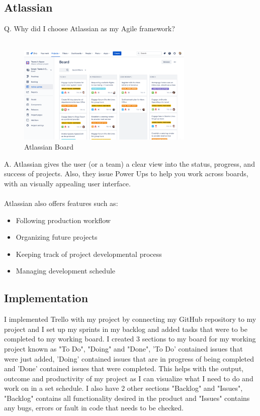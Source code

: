 \subsection{Atlassian}

Q. Why did I choose Atlassian as my Agile framework?\\ \\
\begin{figure}
  \begin{center}
    \includegraphics[width=0.75\textwidth]{img/atlasboard.png}
  \end{center}
  \caption{Atlassian Board}
  \label{fig:Example of Atlassian board}
\end{figure}
A. Atlassian gives the user (or a team) a clear view into the status, progress, and success of projects.  Also, they issue Power Ups to help you work across boards, with an visually appealing user interface.\\ \\
Atlassian also offers features such as:

\begin{itemize}
\item Following production workflow
\item Organizing future projects
\item Keeping track of project developmental process
\item Managing development schedule
\end{itemize}

\subsection{Implementation}

I implemented Trello with my project by connecting my GitHub repository to my project and I set up my sprints in my backlog and added tasks that were to be completed to my working board. I created 3 sections to my board for my working project known as "To Do", "Doing" and "Done", 'To Do' contained issues that were just added, 'Doing' contained issues that are in progress of being completed and 'Done' contained issues that were completed. This helps with the output, outcome and productivity of my project as I can visualize what I need to do and work on in a set schedule. I also have 2 other sections "Backlog" and "Issues", "Backlog" contains all functionality desired in the product and "Issues" contains any bugs, errors or fault in code that needs to be checked.

